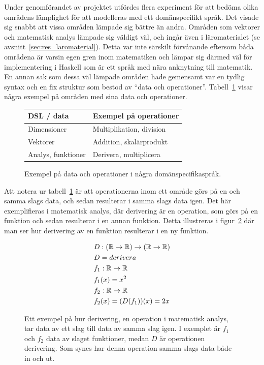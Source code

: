 Under genomförandet av projektet utfördes flera experiment för att bedöma olika
områdens lämplighet för att modelleras med ett domänspecifikt språk. Det visade
sig snabbt att vissa områden lämpade sig bättre än andra. Områden
som vektorer och matematisk analys lämpade sig väldigt väl, och ingår även i
läromaterialet (se avsnitt~\ref{sec:res_laromaterial}). Detta var inte särskilt
förvånande eftersom båda områdena är varsin egen gren inom matematiken
och lämpar sig därmed väl för implementering i Haskell som är ett språk med nära
anknytning till matematik. En annan sak som dessa väl lämpade områden hade
gemensamt var en tydlig syntax och en fix struktur som bestod av ``data och
operationer''. Tabell~\ref{tab:data_och_ops} visar några exempel på områden med
sina data och operationer.

\captionsetup[figure]{name=Tabell}

\begin{figure}[tph]
\centering
\caption{Exempel på data och operationer i några domänspecifikaspråk.}\label{tab:data_och_ops} 
\begin{tabular}{l|l}
\toprule
DSL / data & Exempel på operationer \\ \midrule
Dimensioner & Multiplikation, division \\
Vektorer & Addition, skalärprodukt \\
Analys, funktioner & Derivera, multiplicera \\ \bottomrule
\end{tabular}
\end{figure}

\captionsetup[figure]{name=Figur}

Att notera ur tabell~\ref{tab:data_och_ops} är att operationerna inom ett område
görs på en och samma slags data, och sedan resulterar i samma slags data igen.
Det här exemplifieras i matematisk analys, där derivering är en operation, som
görs på en funktion och sedan resulterar i en annan funktion. Detta illustreras
i figur~\ref{fig:analys_op_exempel} där man ser hur derivering av en funktion
resulterar i en ny funktion.

\begin{figure}[tph]
\begin{mdframed}
  \vspace{-0.5cm}
\begin{align*}
  &D : (\mathbb{R} \rightarrow \mathbb{R}) \rightarrow (\mathbb{R} \rightarrow \mathbb{R}) \\
  &D = derivera \\
  &f_1 : \mathbb{R} \rightarrow \mathbb{R} \\
  &f_1(x) = x^2 \\
  &f_2 : \mathbb{R} \rightarrow \mathbb{R} \\
  &f_2(x) = (D(f_1))(x) = 2x
\end{align*}
\end{mdframed}
\caption{Ett exempel på hur derivering, en operation i matematisk analys, tar
data av ett slag till data av samma slag igen. I exemplet är $f_1$ och $f_2$
data av slaget funktioner, medan $D$ är operationen derivering. Som synes har
denna operation samma slags data både in och ut.}\label{fig:analys_op_exempel}
\end{figure}

